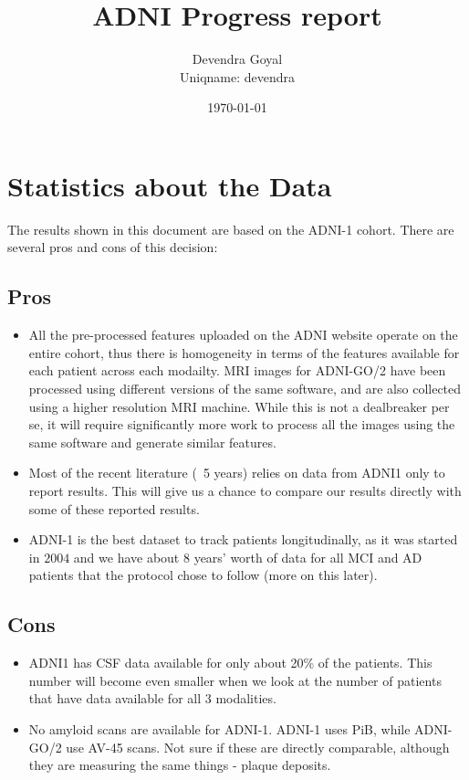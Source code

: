 \documentclass[12pt,a4paper]{article}
\title{ADNI Progress report}
\author{Devendra Goyal\\Uniqname: devendra}
\date{\today}
\begin{document}
\maketitle

\section{Statistics about the Data}
\label{sec:stats}

The results shown in this document are based on the ADNI-1
cohort. There are several pros and cons of this decision:

\subsection{Pros}

\begin{itemize}
\item All the pre-processed features uploaded on the ADNI website
  operate on the entire cohort, thus there is homogeneity in terms of
  the features available for each patient across each modailty. MRI
  images for ADNI-GO/2 have been processed using different versions of
  the same software, and are also collected using a higher resolution
  MRI machine. While this is not a dealbreaker per se, it will require
  significantly more work to process all the images using the same
  software and generate similar features.
\item Most of the recent literature (~5 years) relies on data from ADNI1
  only to report results. This will give us a chance to compare our
  results directly with some of these reported results.
\item ADNI-1 is the best dataset to track patients longitudinally, as
  it was started in $2004$ and we have about $8$ years' worth of data
  for all MCI and AD patients that the protocol chose to follow (more
  on this later). 
\end{itemize}

\subsection{Cons}

\begin{itemize}
\item ADNI1 has CSF data available for only about 20\% of the
  patients. This number will become even smaller when we look at the
  number of patients that have data available for all 3 modalities.
\item No amyloid scans are available for ADNI-1. ADNI-1 uses PiB,
  while ADNI-GO/2 use AV-45 scans. Not sure if these are directly
  comparable, although they are measuring the same things - plaque
  deposits.
\end{itemize}
\end{document}
